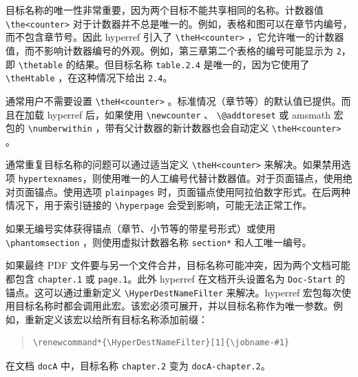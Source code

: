 \documentclass{article}
\newcommand*{\cs}[1]{%
  \texttt{\textbackslash #1}%
}
\newcommand*{\xpackage}[1]{\textsf{#1}}
\begin{document}
目标名称的唯一性非常重要，因为两个目标不能共享相同的名称。计数器值 \cs{the<counter>} 对于计数器并不总是唯一的。例如，表格和图可以在章节内编号，而不包含章节号。因此 \xpackage{hyperref} 引入了 \cs{theH<counter>}，它允许唯一的计数器值，而不影响计数器编号的外观。例如，第三章第二个表格的编号可能显示为 \texttt{2}，即 \cs{thetable} 的结果。但目标名称 \texttt{table.2.4} 是唯一的，因为它使用了 \cs{theHtable}，在这种情况下给出 \verb|2.4|。

通常用户不需要设置 \cs{theH<counter>}。标准情况（章节等）的默认值已提供。而且在加载 \xpackage{hyperref} 后，如果使用 \cs{newcounter}、\cs{@addtoreset} 或 \xpackage{amsmath} 宏包的 \cs{numberwithin}，带有父计数器的新计数器也会自动定义 \cs{theH<counter>}。

通常重复目标名称的问题可以通过适当定义 \cs{theH<counter>} 来解决。如果禁用选项 \texttt{hypertexnames}，则使用唯一的人工编号代替计数器值。对于页面锚点，使用绝对页面锚点。使用选项 \texttt{plainpages} 时，页面锚点使用阿拉伯数字形式。在后两种情况下，用于索引链接的 \cs{hyperpage} 会受到影响，可能无法正常工作。

如果无编号实体获得锚点（章节、小节等的带星号形式）或使用 \cs{phantomsection}，则使用虚拟计数器名称 \texttt{section*} 和人工唯一编号。

如果最终 PDF 文件要与另一个文件合并，目标名称可能冲突，因为两个文档可能都包含 \texttt{chapter.1} 或 \texttt{page.1}。此外 \xpackage{hyperref} 在文档开头设置名为 \texttt{Doc-Start} 的锚点。这可以通过重新定义 \cs{HyperDestNameFilter} 来解决。\xpackage{hyperref} 宏包每次使用目标名称时都会调用此宏。该宏必须可展开，并以目标名称作为唯一参数。例如，重新定义该宏以给所有目标名称添加前缀：
\begin{quote}
\begin{verbatim}
\renewcommand*{\HyperDestNameFilter}[1]{\jobname-#1}
\end{verbatim}
\end{quote}
在文档 \texttt{docA} 中，目标名称 \texttt{chapter.2} 变为 \texttt{docA-chapter.2}。
\end{document}
